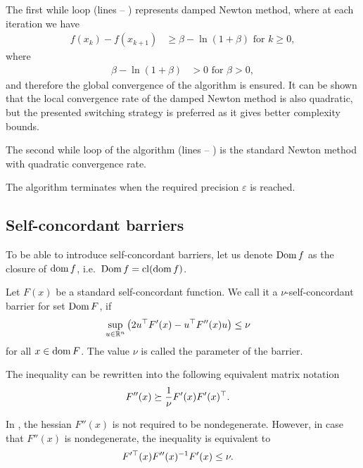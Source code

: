 

The first while loop (lines  -- ) represents damped Newton method, where at each iteration we have
\begin{align}
  f(x_k) - f(x_{k+1}) &\geq \beta - \ln(1+\beta) \text{ for } k \geq 0,
\end{align}
where
\begin{align}
  \beta - \ln(1+\beta) &> 0 \text{ for } \beta > 0,
\end{align}
and therefore the global convergence of the algorithm is ensured.
It can be shown that the local convergence rate of the damped Newton method is also quadratic, but the presented switching strategy is preferred as it gives better complexity bounds.

The second while loop of the algorithm (lines  -- ) is the standard Newton method with quadratic convergence rate.

The algorithm terminates when the required precision $\varepsilon$ is reached.


\subsection{Self-concordant barriers}
To be able to introduce self-concordant barriers, let us denote $\operatorname{Dom} f$ as the closure of $\operatorname{dom} f$, i.e.\ $\operatorname{Dom} f = \operatorname{cl}(\operatorname{dom} f)$.

\begin{definition}
  Let $F(x)$ be a standard self-concordant function. We call it a $\nu$-self-concordant barrier for set $\operatorname{Dom} F$, if
  \begin{align}
    \sup_{u\in\R^n} \big(2u^\top F'(x) - u^\top F''(x) u\big) &\leq \nu \labeleq{SDP:scb:def}
  \end{align}
  for all $x\in\operatorname{dom} F$. The value $\nu$ is called the parameter of the barrier.
\end{definition}

The inequality  can be rewritten into the following equivalent matrix notation
\begin{align}
  F''(x) &\succeq \frac{1}{\nu}F'(x)F'(x)^\top.\labeleq{SDP:scb:def1}
\end{align}

In , the hessian $F''(x)$ is not required to be nondegenerate. However, in case that $F''(x)$ is nondegenerate, the inequality  is equivalent to
\begin{align}
  F'^\top(x)F''(x)^{-1}F'(x) &\leq \nu.\labeleq{SDP:scb:def2}
\end{align}


